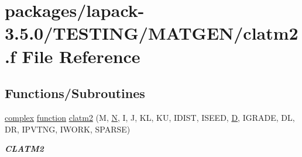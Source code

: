 \hypertarget{clatm2_8f}{}\section{packages/lapack-\/3.5.0/\+T\+E\+S\+T\+I\+N\+G/\+M\+A\+T\+G\+E\+N/clatm2.f File Reference}
\label{clatm2_8f}
\subsection*{Functions/\+Subroutines}
\begin{DoxyCompactItemize}
\item 
\hyperlink{structcomplex}{complex} \hyperlink{afunc_8m_a7b5e596df91eadea6c537c0825e894a7}{function} \hyperlink{group__complex__matgen_ga2689df757dd5958a8c2911a648577d56}{clatm2} (M, \hyperlink{polmisc_8c_a0240ac851181b84ac374872dc5434ee4}{N}, I, J, K\+L, K\+U, I\+D\+I\+S\+T, I\+S\+E\+E\+D, \hyperlink{odrpack_8h_a7dae6ea403d00f3687f24a874e67d139}{D}, I\+G\+R\+A\+D\+E, D\+L, D\+R, I\+P\+V\+T\+N\+G, I\+W\+O\+R\+K, S\+P\+A\+R\+S\+E)
\begin{DoxyCompactList}\small\item\em {\bfseries C\+L\+A\+T\+M2} \end{DoxyCompactList}\end{DoxyCompactItemize}
